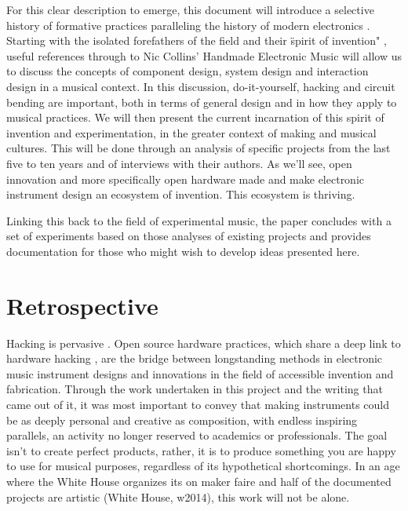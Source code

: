 	For this clear description to emerge, this document will introduce a selective history of formative practices paralleling the history of modern electronics \citep{holmes2002}. Starting with the isolated forefathers of the field and their \"spirit of invention" \citep{dunn2001}, useful references through to Nic Collins' Handmade Electronic Music \citep{collins2006} will allow us to discuss the concepts of component design, system design and interaction design in a musical context. In this discussion, do-it-yourself, hacking and circuit bending are important, both in terms of general design and in how they apply to musical practices. We will then present the current incarnation of this spirit of invention and experimentation, in the greater context of making and musical cultures. This will be done through an analysis of specific projects from the last five to ten years and of interviews with their authors. As we'll see, open innovation \citep{christensen2005} and more specifically open hardware made and make electronic instrument design an ecosystem of invention. This ecosystem is thriving. 

	Linking this back to the field of experimental music, the paper concludes with a set of experiments based on those analyses of existing projects and provides documentation for those who might wish to develop ideas presented here.

\section{Retrospective}

Hacking is pervasive \citep{paradiso2008}. Open source hardware practices, which share a deep link to hardware hacking \citep{williams2012}, are the bridge between longstanding methods in electronic music instrument designs and innovations in the field of accessible invention and fabrication. Through the work undertaken in this project and the writing that came out of it, it was most important to convey that making instruments could be as deeply personal and creative as composition, with endless inspiring parallels, an activity no longer reserved to academics or professionals. The goal isn't to create perfect products, rather, it is to produce something you are happy to use for musical purposes, regardless of its hypothetical shortcomings. In an age where the White House organizes its on maker faire and half of the documented projects are artistic (White House, w2014), this work will not be alone.
	

